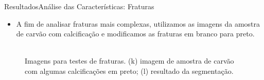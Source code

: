 \documentclass{beamer}
\begin{document}
\begin{frame}{Resultados}{Análise das Características: Fraturas}
   
    \begin{itemize}
        \item A fim de analisar fraturas mais complexas, utilizamos as imagens da amostra de carvão com calcificação e modificamos as fraturas em branco para preto.
    \end{itemize}
    
    \begin{figure}[!htb]
    \centering
     \hspace*{0.1cm}
    \\
    \scriptsize{Imagens para testes de fraturas. (k) imagem de amostra de carvão com algumas calcificações em preto; (l) resultado da segmentação.}
    \end{figure}
\end{frame}
\end{document}
